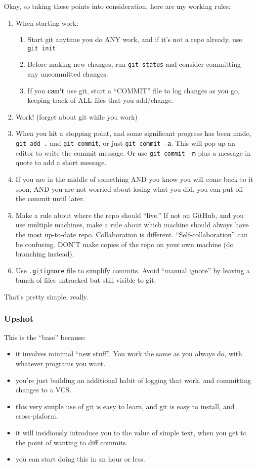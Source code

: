 \documentclass[11pt]{article}
\begin{document}
Okay, so taking these points into consideration, here are my working rules:
\begin{enumerate}
\item When starting work:
\begin{enumerate}
\item Start git anytime you do ANY work, and if it's not a repo already, use \texttt{git init}
\item Before making new changes, run \texttt{git status} and consider committing any uncommitted changes.
\item If you \textbf{can't} use git, start a ``COMMIT'' file to log changes as you go, keeping track of ALL files that you add/change.
\end{enumerate}
\item Work! (forget about git while you work)
\item When you hit a stopping point, and some significant progress has been made, \texttt{git add .} and \texttt{git commit}, or just \texttt{git commit -a}.  This will pop up an editor to write the commit message.  Or use \texttt{git commit -m} plus a message in quote to add a short message.
\item If you are in the middle of something AND you know you will come back to it soon, AND you are not worried about losing what you did, you can put off the commit until later.
\item Make a rule about where the repo should ``live.''  If not on GitHub, and you use multiple machines, make a rule about which machine should always have the most up-to-date repo.  Collaboration is different. ``Self-collaboration'' can be confusing.  DON'T make copies of the repo on your own machine (do branching instead).
\item Use \texttt{.gitignore} file to simplify commits. Avoid ``manual ignore'' by leaving a bunch of files untracked but still visible to git.
\end{enumerate}

That's pretty simple, really.
\subsubsection{Upshot}
\label{sec-3-1-4}

This is the ``base'' because:
\begin{itemize}
\item it involves minimal ``new stuff''.  You work the same as you always do, with whatever programs you want.
\item you're just building an additional habit of logging that work, and committing changes to a VCS.
\item this very simple use of git is easy to learn, and git is easy to install, and cross-plaform.
\item it will insidiously introduce you to the value of simple text, when you get to the point of wanting to diff commits.
\item you can start doing this in an hour or less.
\end{itemize}
\end{document}
